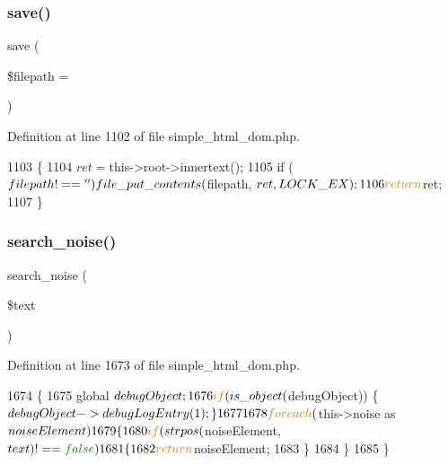 \subsubsection{\texorpdfstring{save()}{save()}}
{\footnotesize\ttfamily save (\begin{DoxyParamCaption}\item[{}]{\$filepath = {\ttfamily \textquotesingle{}\textquotesingle{}} }\end{DoxyParamCaption})}



Definition at line 1102 of file simple\+\_\+html\+\_\+dom.\+php.


\begin{DoxyCode}
1103     \{
1104         $ret = $this->root->innertext();
1105         \textcolor{keywordflow}{if} ($filepath!==\textcolor{stringliteral}{''}) file\_put\_contents($filepath, $ret, LOCK\_EX);
1106         \textcolor{keywordflow}{return} $ret;
1107     \}
\end{DoxyCode}
\hypertarget{classsimple__html__dom_a7bcdfb5fa10cf704553ff32f5f5d693f}{}\label{classsimple__html__dom_a7bcdfb5fa10cf704553ff32f5f5d693f} 
\subsubsection{\texorpdfstring{search\+\_\+noise()}{search\_noise()}}
{\footnotesize\ttfamily search\+\_\+noise (\begin{DoxyParamCaption}\item[{}]{\$text }\end{DoxyParamCaption})}



Definition at line 1673 of file simple\+\_\+html\+\_\+dom.\+php.


\begin{DoxyCode}
1674     \{
1675         global $debugObject;
1676         \textcolor{keywordflow}{if} (is\_object($debugObject)) \{ $debugObject->debugLogEntry(1); \}
1677 
1678         \textcolor{keywordflow}{foreach}($this->noise as $noiseElement)
1679         \{
1680             \textcolor{keywordflow}{if} (strpos($noiseElement, $text)!==\textcolor{keyword}{false})
1681             \{
1682                 \textcolor{keywordflow}{return} $noiseElement;
1683             \}
1684         \}
1685     \}
\end{DoxyCode}
\hypertarget{classsimple__html__dom_a40e8b7bf2a1b1acc56b82f9221fb9266}{}\label{classsimple__html__dom_a40e8b7bf2a1b1acc56b82f9221fb9266} 
